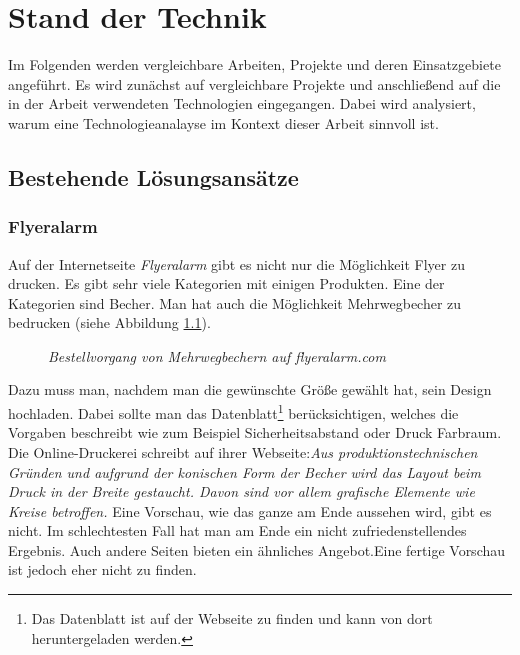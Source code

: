 %
%
%
\chapter{Stand der Technik}
\label{cha:technik}
%
%
Im Folgenden werden vergleichbare Arbeiten, Projekte und deren Einsatzgebiete angeführt. Es wird zunächst auf vergleichbare Projekte und anschließend auf die in der Arbeit verwendeten Technologien eingegangen. Dabei wird analysiert, warum eine Technologieanalayse im Kontext dieser Arbeit sinnvoll ist.
%
%
%
%
%
%
\section{Bestehende Lösungsansätze}
\label{sec:vergleiche}
%
\subsection{Flyeralarm}
\label{sec:flyeralarm}
%
Auf der Internetseite \textit{Flyeralarm} gibt es nicht nur die Möglichkeit Flyer zu drucken. Es gibt sehr viele Kategorien mit einigen Produkten. Eine der Kategorien sind Becher. Man hat auch die Möglichkeit Mehrwegbecher zu bedrucken (siehe Abbildung \ref{fig:flyeralarm}).
%
\begin{figure}
	\centering
	{}
	\caption[Mehrwegbecher bestellen]{\textit{Bestellvorgang von Mehrwegbechern auf flyeralarm.com}}
	\label{fig:flyeralarm}
\end{figure}
% 
Dazu muss man, nachdem man die gewünschte Größe gewählt hat, sein Design hochladen. Dabei sollte man das Datenblatt\footnote{Das Datenblatt ist auf der Webseite zu finden und kann von dort heruntergeladen werden.} berücksichtigen, welches die Vorgaben beschreibt wie zum Beispiel Sicherheitsabstand oder Druck Farbraum. Die Online-Druckerei schreibt auf ihrer Webseite:\textit{\glqq Aus produktionstechnischen Gründen und aufgrund der konischen Form der Becher wird das Layout beim Druck in der Breite gestaucht. Davon sind vor allem grafische Elemente wie Kreise betroffen.\grqq} \cite{flyeralarm_mehrwegbecher_nodate} Eine Vorschau, wie das ganze am Ende aussehen wird, gibt es nicht. Im schlechtesten Fall hat man am Ende ein nicht zufriedenstellendes Ergebnis. Auch andere Seiten bieten ein ähnliches Angebot.Eine fertige Vorschau ist jedoch eher nicht zu finden.
%
